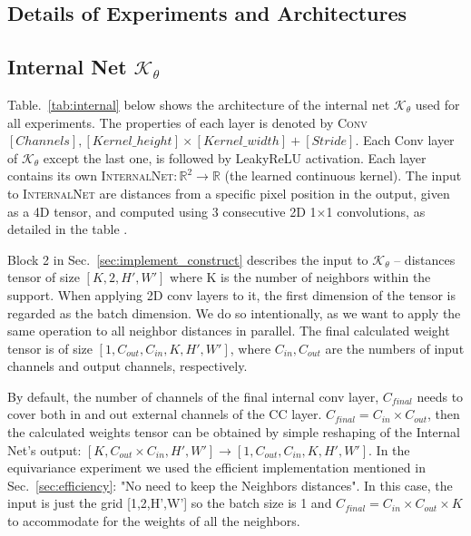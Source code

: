 \begin{appendices}
\section{Details of Experiments and Architectures}

\subsection{Internal Net $\mathcal{K}_\theta$}
Table.~\ref{tab:internal} below shows the architecture of the internal net $\mathcal{K}_\theta$ used for all experiments. The properties of each layer is denoted by  \textsc{Conv} $[Channels], [Kernel\_height] \times [Kernel\_width] + [Stride]$. Each Conv layer of  $\mathcal{K}_\theta$ except the last one, is followed by LeakyReLU activation. Each \CC layer contains its own \textsc{InternalNet}$: \mathbb{R}^2 \to \mathbb{R}$ (the learned continuous kernel). The input to \textsc{InternalNet} are distances from a specific pixel position in the output, given as a 4D tensor, and computed using $3$ consecutive 2D 1$\times$1 convolutions, as detailed in the table .

Block 2 in Sec.~\ref{sec:implement_construct} describes the input to $\mathcal{K}_\theta$ -- distances tensor of size $[K,2,H',W']$ where K is the number of neighbors within the support. When applying 2D conv layers to it, the first dimension of the tensor is regarded as the batch dimension. We do so intentionally, as we want to apply the same operation to all neighbor distances in parallel. The final calculated weight tensor is of size $[1,C_{out},C_{in},K,H',W']$, where $C_{in}, C_{out}$ are the numbers of input channels and output channels, respectively. 

By default, the number of channels of the final internal conv layer,  {$C_{final}$} needs to cover both in and out external channels of the CC layer. {$C_{final} = C_{in} \times C_{out}$}, then the calculated weights tensor  can be obtained by simple reshaping of the Internal Net's output: 
$[K, C_{out}\times C_{in}, H', W'] \rightarrow [1,C_{out},C_{in},K,H',W']$. 
In the equivariance experiment we used the efficient implementation mentioned in Sec.~\ref{sec:efficiency}: "No need to keep the Neighbors distances". In this case, the input is just the grid [1,2,H',W'] so the batch size is 1 and {$C_{final} = C_{in} \times C_{out} \times K$} to accommodate for the weights of all the neighbors.


\end{appendices}
